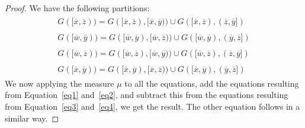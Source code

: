 \documentclass[12pt,article]{amsart}
\numberwithin{equation}{section}
\numberwithin{figure}{section}
\theoremstyle{definition}
\theoremstyle{plain}
\begin{document}
\begin{proof}

We have the following partitions:
\begin{subequations}
\begin{align}
\begin{split}
G([\overline{x},\overline{z})) = G([\overline{x},\overline{z}), [\overline{x},\overline{y})) \cup G([\overline{x},\overline{z}), (\overline{z},\overline{y}])
\label{eq1}
\end{split}\\
\begin{split}
G([\overline{w},\overline{y}))=G([\overline{w},\overline{y}), [\overline{w},\overline{z})) \cup G([\overline{w},\overline{y}), (\overline{y},\overline{z}])
\label{eq2}
\end{split}\\
\begin{split}
G([\overline{w},\overline{z}))=G([\overline{w},\overline{z}), [\overline{w},\overline{y})) \cup G([\overline{w},\overline{z}), (\overline{z},\overline{y}])
\label{eq3}
\end{split}\\
\begin{split}
G([\overline{x},\overline{y}))=G([\overline{x},\overline{y}), [\overline{x},\overline{z})) \cup G([\overline{x},\overline{y}), (\overline{y},\overline{z}])
\label{eq4}
\end{split}
\end{align}
\end{subequations}
We now applying the measure $\mu$ to all the equations, add the equations resulting from Equation~\ref{eq1} and~\ref{eq2}, and subtract this from the equations resulting from Equation~\ref{eq3} and~\ref{eq4}, we get the result. The other equation follows in a similar way.
\end{proof}
\end{document}
